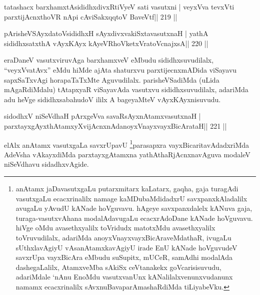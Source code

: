 
\begin{shl}
tatashacx barxhamxtAsididhxdivxRtiVyeV sati vasutxni |
veyxVva tevxVti parxtijAcnxthoVR nApi cA\s\s viSakxqqtoV BaveVtf\hfill || 219 ||
\end{shl}

\begin{shl}
pArisheVSAyxdatoV\s sididhxH sAyxdivxvakiSxtavasutxnaH |
yathA sididhxsatxthA vAyxKAyx kAyeVRhoVketxVratoV\s cnajxsA\hfill || 220 ||
\end{shl}


\begin{artha}
eraDaneV vasutxviruvAga barxhamxveV eMbudu sididhxsuvudilalx, ``veyxVvatAvx'' eMdu hiMde ajAta shaturxvu parxtijecnxmADida viSayavu sapxSaTxvAgi horapaTaTxMte Aguvudilalx. parisheVSadiMda (uLida mAgaRdiMdalu) tAtapxyaR viSayavAda vasutxvu sididhxsuvudilalx, adariMda adu heVge sididhxsabahudoV ililx A bageyaMteV vAyxKAyxnisuvudu.
\end{artha}

\begin{shl}
sidodhxV niSeVdhaH pArxgeVva savaRsAyxnAtamxvasutxnaH |
parxtayxgAyxthAtamxyXvijAcnxnAdanoyxVnayxvayxBicArataH\hfill || 221 ||
\end{shl}

\begin{artha}
elAlx anAtamx vasutxgaLa savxrUpavU \footnote{anAtamx
  jaDavasutxgaLu putarxmitarx kaLatarx, gaqha, gaja turagAdi vasutxgaLu
  ecacxrinalilx namage kaMDubaMdidadxrU savxpanxkAladalilx avugaLu
  yAvudU kANade hoVguvavu. hAgeye savxpanxdalelx kANuva gaja,
  turaga-vasutxvAhana modalAdavugaLu ecacxrAdoDane kANade hoVguvavu.
  hiVge oMdu avasethxyalilx toVridudx matotxMdu avasethxyalilx
  toVruvudilalx, adariMda anoyxVnayxvayxBicAraveMdathaR,
  ivugaLu sUthxlavAgiyU vAsanAtamxkavAgiyU irade EnU kANade hoVguvudeV
  savxrUpa vayxBicAra eMbudu suSupitx, mUCeR, samAdhi modalAda
  dashegaLalilx, AtamxveMba sAkiSx ceVtanakekx goVcarisisuvudu,
  adariMdale `nAnu EnoMdu vasutxvanUnx kANalilalxvenunxvudanunx namamx
  ecacxrinalilx sAvxnuBavaparAmashaRdiMda tiLiyabeVku.}parasapxra
vayxBicaritavAdadxriMda AdeVsha vAkayxdiMda parxtayxgAtamxna
yathAthaRjAcnxnavAguva modaleV niSeVdhavu sidadhxvAgide.
\end{artha}

